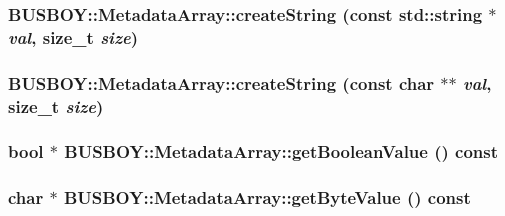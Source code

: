 \label{classBUSBOY_1_1MetadataArray_a5215e46b13859c6f7efef8536f76d6ad}
\hypertarget{classBUSBOY_1_1MetadataArray_a14a666ffeef5adfb90f117b02c5a5646}{
\subsubsection[{createString}]{ BUSBOY::MetadataArray::createString (const std::string $\ast$ {\em val}, \/  size\_\-t {\em size})}}
\label{classBUSBOY_1_1MetadataArray_a14a666ffeef5adfb90f117b02c5a5646}
\hypertarget{classBUSBOY_1_1MetadataArray_af8cf9e28152c4a5333dcaf707d7a6a19}{
\subsubsection[{createString}]{ BUSBOY::MetadataArray::createString (const char $\ast$$\ast$ {\em val}, \/  size\_\-t {\em size})}}
\label{classBUSBOY_1_1MetadataArray_af8cf9e28152c4a5333dcaf707d7a6a19}
\hypertarget{classBUSBOY_1_1MetadataArray_a314eab0a563dbca2f312c20d0a2e5568}{
\subsubsection[{getBooleanValue}]{\setlength{\rightskip}{0pt plus 5cm}bool $\ast$ BUSBOY::MetadataArray::getBooleanValue () const}}
\label{classBUSBOY_1_1MetadataArray_a314eab0a563dbca2f312c20d0a2e5568}
\hypertarget{classBUSBOY_1_1MetadataArray_a10840e6a5a0cbfbcca61018e2f682e07}{
\subsubsection[{getByteValue}]{\setlength{\rightskip}{0pt plus 5cm}char $\ast$ BUSBOY::MetadataArray::getByteValue () const}}
